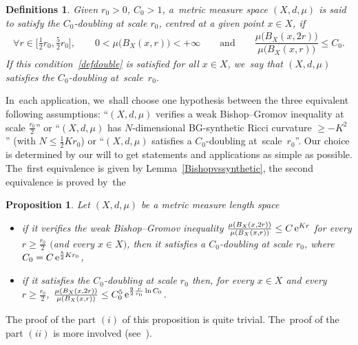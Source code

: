 \documentclass[pdftex]{sigma}
\numberwithin{equation}{section}
\newtheorem{prop}[theor]{Proposition}
\newtheorem{defis}[theor]{Definitions}
\begin{document}
\begin{defis}%
Given $r_0 > 0$, $C_0 > 1$, a~metric measure space $(X,d, \mu)$ is said to satisfy the $C_0$-doubling at scale $r_0$, centred at a given point $x \in X$, if
\begin{gather}\label{defdouble}
\forall r \in \bigg[\frac{1}{2} r_0, \frac{5}{2} r_0\bigg], \qquad
0 < \mu \big(B_X(x, r)\big) < +\infty \qquad
\text{and} \qquad\dfrac{\mu \big(B_X(x, 2 r)\big)}{\mu \big(B_X(x,r)\big)} \le C_0.
\end{gather}
If this condition~\eqref{defdouble} is satisfied for all $ x \in X $, we~say that $ (X,d, \mu) $ satisfies the $C_0$-doubling at~scale~$r_0$.
\end{defis}

\medskip\noindent
{
In~each application, we~shall choose one hypothesis between the three
equivalent following assumptions: ``$(X,d, \mu)$ verifies a weak Bishop--Gromov inequality at scale $\frac{r_0}{2}$'' or
``$(X,d, \mu)$ has $N$-dimensional BG-synthetic Ricci curvature $\ge -K^2\,$'' (with $N \le \frac{1}{2} K r_0$) or ``$(X,d, \mu)$ satisfies a
$C_0$-doubling at~scale~$r_0$''. Our choice is determined by our will to get statements and applications as simple as possible. The~first equivalence is given by Lemma~\ref{Bishopvssynthetic}, the second equivalence is proved by~the

}

\begin{prop}\label{croissanceVol}
Let $(X,d, \mu)$ be a metric measure length space
\begin{itemize}\itemsep=0pt
\item[$(i)$]
if it verifies the weak Bishop--Gromov inequality $\frac{\mu (B_X(x, 2 r))}{\mu(B_X(x,r))} \le C\, {\rm e}^{K r}$ for every $r \ge \frac{r_0}{2}$ $($and every $x \in X)$, then it satisfies a $C_0$-doubling at scale $r_0$, where $C_0 = C\, {\rm e}^{\frac{5}{2} K r_0}$,
\item[$(ii)$]
if it satisfies the $C_0$-doubling at scale $r_0$ then, for every $x \in X$ and every $r \ge \frac{r_0}{2}$, $\frac{\mu (B_X (x,2r))}{\mu (B_X (x,r))} \le C_0^5 \, {\rm e}^{\frac{9}{2} \frac{ r}{r_0}\ln C_0} $.
\end{itemize}
\end{prop}

The proof of the part $(i)$ of this proposition is quite trivial. The~proof
of the part $(ii)$ is more involved (see~\cite{BCGS2}).
\end{document}
